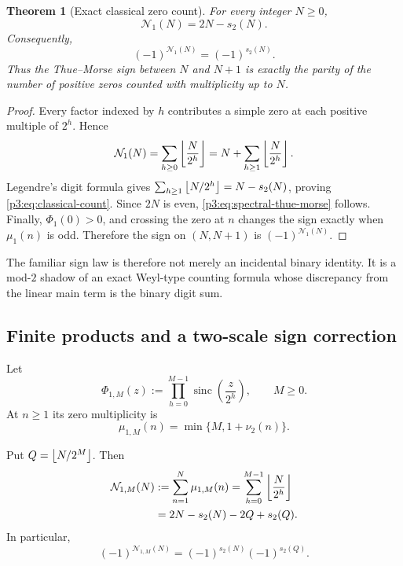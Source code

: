 \documentclass[11pt,oneside]{article}
\newtheorem{theorem}{Theorem}[section]
\theoremstyle{definition}
\theoremstyle{remark}
\newcommand{\sinc}{\operatorname{sinc}}
\begin{document}
\begin{theorem}[Exact classical zero count]\label{p3:thm:classical-count}
For every integer $N\ge0$,
\begin{equation}\label{p3:eq:classical-count}
  \mathcal N_1(N)=2N-s_2(N).
\end{equation}
Consequently,
\begin{equation}\label{p3:eq:spectral-thue-morse}
  (-1)^{\mathcal N_1(N)}=(-1)^{s_2(N)}.
\end{equation}
Thus the Thue--Morse sign between $N$ and $N+1$ is exactly the parity of the number of positive zeros counted with multiplicity up to $N$.
\end{theorem}

\begin{proof}
Every factor indexed by $h$ contributes a simple zero at each positive multiple of $2^h$.  Hence
\[
 \mathcal N_1(N)=\sum_{h\ge0}\left\lfloor \frac N{2^h}\right\rfloor
 =N+\sum_{h\ge1}\left\lfloor \frac N{2^h}\right\rfloor.
\]
Legendre's digit formula gives $\sum_{h\ge1}\left\lfloor N/2^h\right\rfloor=N-s_2(N)$, proving \eqref{p3:eq:classical-count}.  Since $2N$ is even, \eqref{p3:eq:spectral-thue-morse} follows.  Finally, $\Phi_1(0)>0$, and crossing the zero at $n$ changes the sign exactly when $\mu_1(n)$ is odd.  Therefore the sign on $(N,N+1)$ is $(-1)^{\mathcal N_1(N)}$.
\end{proof}

\begin{remark}
The familiar sign law is therefore not merely an incidental binary identity.  It is a mod-$2$ shadow of an exact Weyl-type counting formula whose discrepancy from the linear main term is the binary digit sum.
\end{remark}

\subsection{Finite products and a two-scale sign correction}

Let
\[
  \Phi_{1,M}(z):=\prod_{h=0}^{M-1}\sinc\!\left(\frac z{2^h}\right),
  \qquad M\ge0.
\]
At $n\ge1$ its zero multiplicity is
\[
  \mu_{1,M}(n)=\min\{M,1+\nu_2(n)\}.
\]

\begin{proposition}\label{p3:prop:finite-classical}
Put $Q=\left\lfloor N/2^M\right\rfloor$.  Then
\begin{align}
 \mathcal N_{1,M}(N)
 &:=\sum_{n=1}^{N}\mu_{1,M}(n)
   =\sum_{h=0}^{M-1}\left\lfloor \frac N{2^h}\right\rfloor\label{p3:eq:finite-count-floor}\\
 &=2N-s_2(N)-2Q+s_2(Q).\label{p3:eq:finite-count-digital}
\end{align}
In particular,
\begin{equation}\label{p3:eq:finite-sign}
  (-1)^{\mathcal N_{1,M}(N)}
  =(-1)^{s_2(N)}(-1)^{s_2(Q)}.
\end{equation}
\end{proposition}
\end{document}
